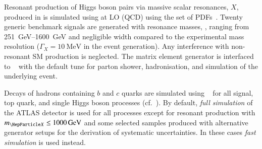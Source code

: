 Resonant production of Higgs boson pairs via massive scalar
resonances, $X$, produced in \ggF is simulated using \MGNLO at LO
(QCD) using the \NNPDF[2.3lo] set of PDFs~\cite{Ball:2012cx}. Twenty
generic benchmark signals are generated with resonance masses, \mX,
ranging from \SIrange{251}{1600}{\GeV} and negligible width compared
to the experimental mass resolution ($\Gamma_{X} = \SI{10}{\MeV}$ in
the event generation). Any interference with non-resonant SM \HH
production is neglected. The matrix element generator is interfaced to
\HERWIG[7.1]~\cite{Gieseke:2012ft,Bellm:2017jjp} with the default tune
for parton shower, hadronisation, and simulation of the underlying
event.

Decays of hadrons containing $b$ and $c$ quarks are simulated using
\EVTGEN~\cite{Lange:2001uf} for all signal, top quark, and single
Higgs boson processes (cf.~). By default,
\emph{full simulation} of the ATLAS detector is used for all processes
except for resonant \HH production with $\mX \leq \SI{1000}{\GeV}$ and
some selected samples produced with alternative generator setups for
the derivation of systematic uncertainties. In these cases \emph{fast
  simulation} is used instead.

